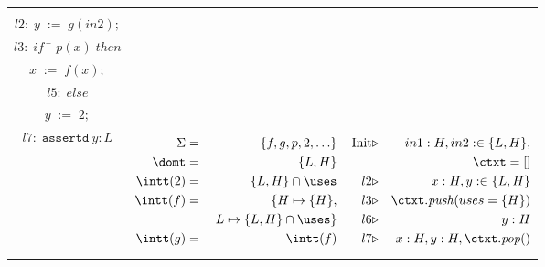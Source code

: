 \documentclass[preprint]{sig-alternate-05-2015}
\def\Sig{{\Sigma}}
\def\assertt{{\mathtt{assertd}}}
\def\iteif{{\mathit{if}}}
\def\itethen{{\mathit{then}}}
\def\iteelse{{\mathit{else}}}
\def\push{{\mathit{push}}}
\def\pop{{\mathit{pop}}}
\begin{document}
{\begin{figure}[htp]
  \begin{tabular}{c|c|c}
    \begin{minipage}{50mm}
      \begin{tabbing}
        $l1:\; x \; := \; f(in1) ;$ \\
        $l2:\; y \; := \; g(in2) ;$ \\
        $l3:\; \iteif \;$ \= $p(x)\;\itethen$ \\ \>
           $x\; := \; f(x);$ \\
        $l5:\; \iteelse$ \\ \>
           $y\; := \; 2;$ \\
        $l7:\; \assertt~ y:L$
      \end{tabbing}
    \end{minipage}
    &
    \begin{minipage}{60mm}
      \vspace*{-1em}
      \begin{eqnarray*}
        \Sig & = & \{f, g, p, 2, \ldots\} \\
       \domt & = & \{L,H\} \\
    \intt(2) & = & \{L,H\}\cap \uses \\
    \intt(f) & = & \{H\mapsto\{H\}, \\
             &   & \;L\mapsto\{L,H\}\cap\uses\} \\
    \intt(g) & = & \intt(f)
      \end{eqnarray*}
    \end{minipage}
    &
    \begin{minipage}{50mm}
      \begin{eqnarray*}
        \mbox{Init} & \triangleright & in1:H, in2:\in \{L,H\}, \\
                    & & \ctxt = [ ] \\
                  l2 & \triangleright & x:H, y:\in\{L,H\} \\
                  l3 & \triangleright & \ctxt.\push( uses=\{H\}) \\
                  l6 & \triangleright & y:H \\
                  l7 & \triangleright & x:H, y:H, \ctxt.\pop() \\
      \end{eqnarray*}
    \end{minipage}

\end{tabular}
\end{figure}}
\end{document}
